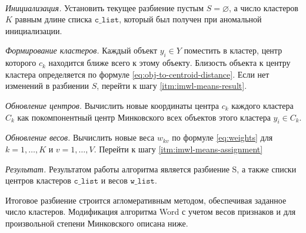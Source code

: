 \documentclass[12pt]{a&t}
\begin{document}
\begin{algorithm} \label{alg:imwk-means}
	\
	\begin{enumlist}[.] 
		
		\item \textit{Инициализация.} Установить текущее разбиение пустым $ S=\varnothing $, а число кластеров $ K $ равным длине списка $ \mathtt{c\_list} $, который был получен при аномальной инициализации. 
		
		\item \label{itm:imwl-means-assignment}\textit{Формирование кластеров.} Каждый объект $ y_i \in Y $ поместить в кластер, центр которого $ c_k $ находится ближе всего к этому объекту. Близость объекта к центру кластера определяется  по формуле \ref{eq:obj-to-centroid-distance}. Если нет изменений в разбиении $  S $, перейти к шагу \ref{itm:imwl-means-result}.
		
		\item \textit{Обновление центров.} Вычислить новые координаты центра $ c_k $ каждого кластера $ C_k $ как покомпонентный центр Минковского всех объектов этого кластера $ y_i \in C_k $.
		
		\item \textit{Обновление весов.} Вычислить новые веса $ w_{kv} $ по формуле \ref{eq:weights} для $ k=1,\ldots,K $ и $ v=1,\ldots,V $. Перейти к шагу \ref{itm:imwl-means-assignment}
		
		\item \label{itm:imwl-means-result} \textit{ Результат.} Результатом работы алгоритма является разбиение S, а также списки центров кластеров $ \mathtt{c\_list} $ и весов $ \mathtt{w\_list} $.
	\end{enumlist}
\end{algorithm}

Итоговое разбиение строится агломеративным методом, обеспечивая заданное число кластеров. Модификация алгоритма Word с учетом весов признаков и для произвольной степени Минковского описана ниже.
\end{document}
